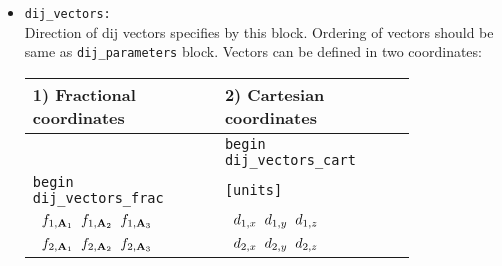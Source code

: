 \documentclass[10pt]{report}
\def\la{\large}
\begin{document}
\begin{itemize}
\begin{verbatim}
 Begin Dij_parameters
  [units]
  site1:site2:dij_param
 End Dij_parameters
\end{verbatim}
{\tt units}\\
Same as described above for {\tt jij\_parameters}.\\
{\tt site1:site2:dij\_param}\\
Same as described above for {\tt jij\_parameters}.\\
Example:
{\tt c1=0.0,0.0,0.0:c2=2.5,2.5,2.5:dij=0.0002}
\item {\tt dij\_vectors: }                   \\
Direction of dij vectors specifies by this block. Ordering of vectors should be same as {\tt dij\_parameters} block.
Vectors can be defined in two coordinates:
\begin{center}
    \begin{tabular}{p{0.4\linewidth}p{0.4\linewidth}}
        \toprule
        \multicolumn{1}{l}{\la 1) Fractional coordinates} & \multicolumn{1}{l}{\la 2) Cartesian coordinates} \\ \midrule
                                 & {\tt begin dij\_vectors\_cart} \\
         {\tt begin dij\_vectors\_frac} & {\tt [units]}                   \\
        {\tt \hspace{0.2cm}  $ f_{1,\textbf{A}_1} \hspace{0.2cm} f_{1,\textbf{A}_2} \hspace{0.2cm} f_{1,\textbf{A}_3}  $}  &
        {\tt \hspace{0.2cm}  $ d_{1,x} \hspace{0.2cm} d_{1,y} \hspace{0.2cm} d_{1,z} $}  \\
        {\tt \hspace{0.2cm}  $ f_{2,\textbf{A}_1} \hspace{0.2cm} f_{2,\textbf{A}_2} \hspace{0.2cm} f_{2,\textbf{A}_3}  $}  &
        {\tt \hspace{0.2cm}  $ d_{2,x} \hspace{0.2cm} d_{2,y} \hspace{0.2cm} d_{2,z}  $}  \\

\end{tabular}
\end{center}
\end{itemize}
\end{document}
